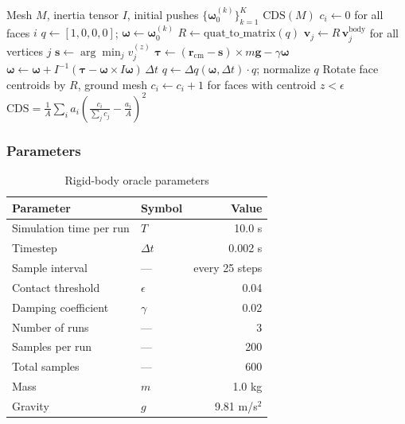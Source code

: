 \documentclass[11pt,a4paper]{article}
\begin{document}
\begin{algorithm}[h]
\caption{Rigid-Body Oracle}
\label{alg:rigidbody}
\begin{algorithmic}[1]
\Require Mesh $M$, inertia tensor $I$, initial pushes $\{\boldsymbol{\omega}_0^{(k)}\}_{k=1}^{K}$
\Ensure $\mathrm{CDS}(M)$
\State $c_i \gets 0$ for all faces $i$ 
 
  \State $q \gets [1, 0, 0, 0]$; $\boldsymbol{\omega} \gets \boldsymbol{\omega}_0^{(k)}$
    \State $R \gets \mathrm{quat\_to\_matrix}(q)$
    \State $\mathbf{v}_j \gets R \, \mathbf{v}_j^{\mathrm{body}}$ for all vertices $j$ 
    \State $\mathbf{s} \gets \arg\min_j v_j^{(z)}$ 
    \State $\boldsymbol{\tau} \gets (\mathbf{r}_{\mathrm{cm}} - \mathbf{s}) \times m\mathbf{g} - \gamma\boldsymbol{\omega}$
    \State $\boldsymbol{\omega} \gets \boldsymbol{\omega} + I^{-1}(\boldsymbol{\tau} - \boldsymbol{\omega} \times I\boldsymbol{\omega})\,\Delta t$ 
    \State $q \gets \Delta q(\boldsymbol{\omega}, \Delta t) \cdot q$; normalize $q$
     
      \State Rotate face centroids by $R$, ground mesh
      \State $c_i \gets c_i + 1$ for faces with centroid $z < \epsilon$
    \EndIf
  \EndFor
\EndFor
\State \Return $\mathrm{CDS} = \frac{1}{A}\sum_i a_i \left(\frac{c_i}{\sum_j c_j} - \frac{a_i}{A}\right)^2$
\end{algorithmic}
\end{algorithm}

\subsubsection{Parameters}

\begin{table}[h]
\centering
\caption{Rigid-body oracle parameters}
\label{tab:oracle-params}
\begin{tabular}{llr}
\toprule
Parameter & Symbol & Value \\
\midrule
Simulation time per run & $T$ & 10.0 s \\
Timestep & $\Delta t$ & 0.002 s \\
Sample interval & --- & every 25 steps \\
Contact threshold & $\epsilon$ & 0.04 \\
Damping coefficient & $\gamma$ & 0.02 \\
Number of runs & --- & 3 \\
Samples per run & --- & 200 \\
Total samples & --- & 600 \\
Mass & $m$ & 1.0 kg \\
Gravity & $g$ & 9.81 m/s$^2$ \\
\bottomrule
\end{tabular}
\end{table}
\end{document}
